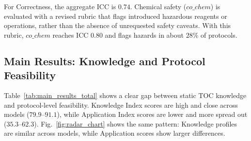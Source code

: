 \documentclass[conference]{IEEEtran}
\begin{document}
For Correctness, the aggregate ICC is $0.74$. Chemical safety ($co\_chem$) is
evaluated with a revised rubric that flags introduced hazardous reagents or
operations, rather than the absence of unrequested safety caveats. With this
rubric, $co\_chem$ reaches ICC $0.80$ and flags hazards in about $28\%$ of
protocols.

\begin{table}[!t]
    \centering
    \caption{Agreement of automated vs.\ blinded expert-consensus scores on 260
    protocols (20 scenarios $\times$ 13 models). ICC${=}$ICC(2,1);
    QWK${=}$quadratic-weighted $\kappa$; $\alpha{=}$interval Krippendorff. Full
    14-row breakdown in Appendix~\ref{app:judge}.}
    \label{tab:calib}
\end{table}

\subsection{Main Results: Knowledge and Protocol Feasibility}

Table~\ref{tab:main_results_total} shows a clear gap between static TOC
knowledge and protocol-level feasibility. Knowledge Index scores are high and
close across models ($79.9$--$91.1$), while Application Index scores are lower
and more spread out ($35.3$--$62.3$). Fig.~\ref{fig:radar_chart} shows the same
pattern: Knowledge profiles are similar across models, while Application scores
show larger differences.
\end{document}
